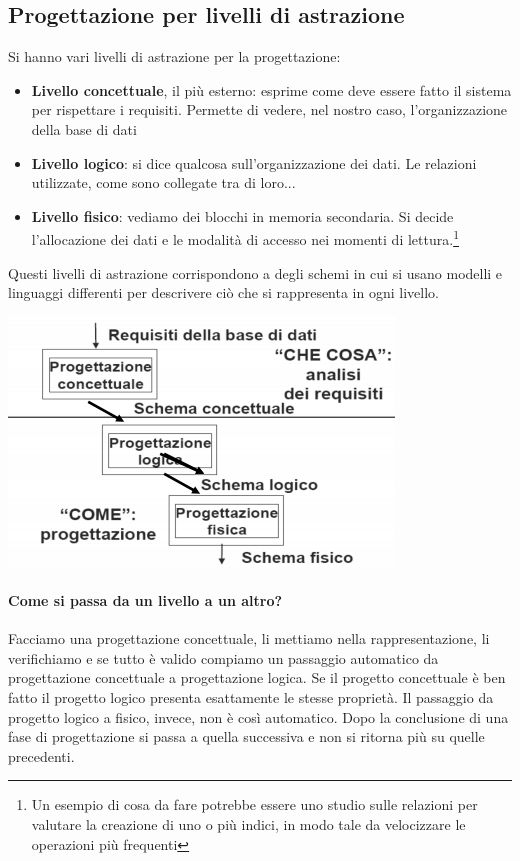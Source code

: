 \subsection{Progettazione per livelli di astrazione}
Si hanno vari livelli di astrazione per la progettazione:
\begin{itemize}
	\item \textbf{Livello concettuale}, il più esterno: esprime come deve essere fatto il sistema per rispettare i requisiti. Permette di vedere, nel nostro caso, l'organizzazione della base di dati
	\item \textbf{Livello logico}: si dice qualcosa sull'organizzazione dei dati. Le relazioni utilizzate, come sono collegate tra di loro...
	\item \textbf{Livello fisico}: vediamo dei blocchi in memoria secondaria. Si decide l'allocazione dei dati e le modalità di accesso nei momenti di lettura.\footnote{Un esempio di cosa da fare potrebbe essere uno studio sulle relazioni per valutare la creazione di uno o più indici, in modo tale da velocizzare le operazioni più frequenti}
\end{itemize}
Questi livelli di astrazione corrispondono a degli schemi in cui si usano modelli e linguaggi differenti per descrivere ciò che si rappresenta in ogni livello.
\begin{center}\includegraphics{images/3.PNG}\end{center}
\paragraph{Come si passa da un livello a un altro?} Facciamo una progettazione concettuale, li mettiamo nella rappresentazione, li verifichiamo e se tutto è valido compiamo un passaggio automatico da progettazione concettuale a progettazione logica. Se il progetto concettuale è ben fatto il progetto logico presenta esattamente le stesse proprietà. Il passaggio da progetto logico a fisico, invece, non è così automatico. Dopo la conclusione di una fase di progettazione si passa a quella successiva e non si ritorna più su quelle precedenti.
